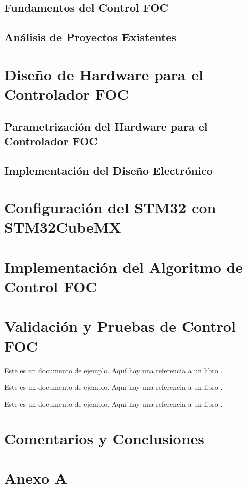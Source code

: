 \documentclass[11pt]{report}
\begin{document}
\section{Fundamentos del Control FOC}
\section{Análisis de Proyectos Existentes}

\newpage
\chapter{Diseño de Hardware para el Controlador FOC}
\section{Parametrización del Hardware para el Controlador FOC}
\section{Implementación del Diseño Electrónico}

\newpage
\chapter{Configuración del STM32 con STM32CubeMX}

\newpage
\chapter{Implementación del Algoritmo de Control FOC}

\newpage
\chapter{Validación y Pruebas de Control FOC}
Este es un documento de ejemplo. Aquí hay una referencia a un libro \cite{power_conv_00}.

Este es un documento de ejemplo. Aquí hay una referencia a un libro \cite{AN2757_00}.

Este es un documento de ejemplo. Aquí hay una referencia a un libro \cite{odrive_SVM}.

\newpage
\chapter*{Comentarios y Conclusiones}

\newpage
{}
\printbibliography

\newpage
{}

\chapter*{Anexo A}
\end{document}
